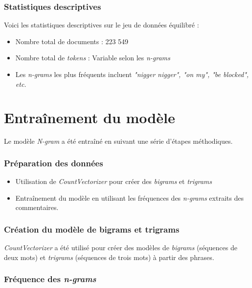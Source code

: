 \subsubsection{Statistiques descriptives}

Voici les statistiques descriptives sur le jeu de données équilibré :

\begin{itemize}
    \item Nombre total de documents : 223 549
    \item Nombre total de \textit{tokens} : Variable selon les \textit{n-grams}
    \item Les \textit{n-grams} les plus fréquents incluent \textit{"nigger nigger", "on my", "be blocked", etc.}
\end{itemize}

\section{Entraînement du modèle}

Le modèle \textit{N-gram} a été entraîné en suivant une série d'étapes méthodiques.

\subsubsection{Préparation des données}

\begin{itemize}
    \item Utilisation de \textit{CountVectorizer} pour créer des \textit{bigrams} et \textit{trigrams}
    \item Entraînement du modèle en utilisant les fréquences des \textit{n-grams} extraits des commentaires.
\end{itemize}

\subsubsection{Création du modèle de bigrams et trigrams}

\textit{CountVectorizer} a été utilisé pour créer des modèles de \textit{bigrams} (séquences de deux mots) et \textit{trigrams} (séquences de trois mots) à partir des phrases.

\subsubsection{Fréquence des \textit{n-grams}}

